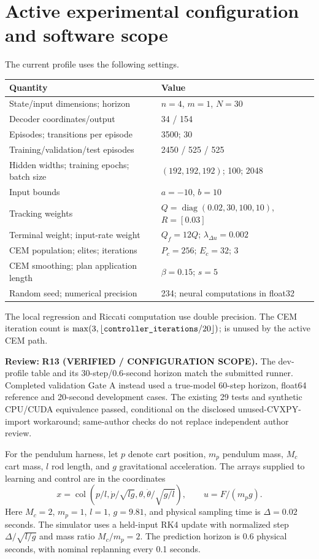 \documentclass[11pt]{article}
\newcommand{\col}{\operatorname{col}}
\newcommand{\review}[1]{\par\noindent\textcolor{red!70!black}{\textbf{Review:} #1}\par}
\newcommand{\code}[1]{\texttt{\detokenize{#1}}}
\begin{document}
\section{Active experimental configuration and software scope}
The current \code{dev} profile uses the following settings.
\begin{center}
\small
\begin{tabular}{@{}ll@{}}
\toprule
Quantity & Value\\\midrule
State/input dimensions; horizon & $n=4$, $m=1$, $N=30$\\
Decoder coordinates/output & 34 / 154\\
Episodes; transitions per episode & 3500; 30\\
Training/validation/test episodes & 2450 / 525 / 525\\
Hidden widths; training epochs; batch size & $(192,192,192)$; 100; 2048\\
Input bounds & $a=-10$, $b=10$\\
Tracking weights & $Q=\operatorname{diag}(0.02,30,100,10)$, $R=[0.03]$\\
Terminal weight; input-rate weight & $Q_f=12Q$; $\lambda_{\Delta u}=0.002$\\
CEM population; elites; iterations & $P_c=256$; $E_c=32$; 3\\
CEM smoothing; plan application length & $\beta=0.15$; $s=5$\\
Random seed; numerical precision & 234; neural computations in float32\\\bottomrule
\end{tabular}
\end{center}
The local regression and Riccati computation use double precision. The CEM iteration count is $\max(3,\lfloor\code{controller_iterations}/20\rfloor)$; \code{controller_lr} is unused by the active CEM path.
\review{\textbf{R13 (VERIFIED / CONFIGURATION SCOPE).} The dev-profile table and its 30-step/0.6-second horizon match the submitted runner. Completed validation Gate A instead used a true-model 60-step horizon, float64 reference and 20-second development cases. The existing 29 tests and synthetic CPU/CUDA equivalence passed, conditional on the disclosed unused-CVXPY-import workaround; same-author checks do not replace independent author review.}


For the pendulum harness, let $p$ denote cart position, $m_p$ pendulum mass, $M_c$ cart mass, $l$ rod length, and $g$ gravitational acceleration. The arrays supplied to learning and control are in the coordinates
\begin{equation}\label{eq:units}
x=\col\left(p/l,\dot p/\sqrt{lg},\theta,\dot\theta/\sqrt{g/l}\right),\qquad u=F/(m_p g).
\end{equation}
Here $M_c=2$, $m_p=1$, $l=1$, $g=9.81$, and physical sampling time is $\Delta=0.02$ seconds. The simulator uses a held-input RK4 update with normalized step $\Delta/\sqrt{l/g}$ and mass ratio $M_c/m_p=2$. The prediction horizon is 0.6 physical seconds, with nominal replanning every 0.1 seconds.
\end{document}
